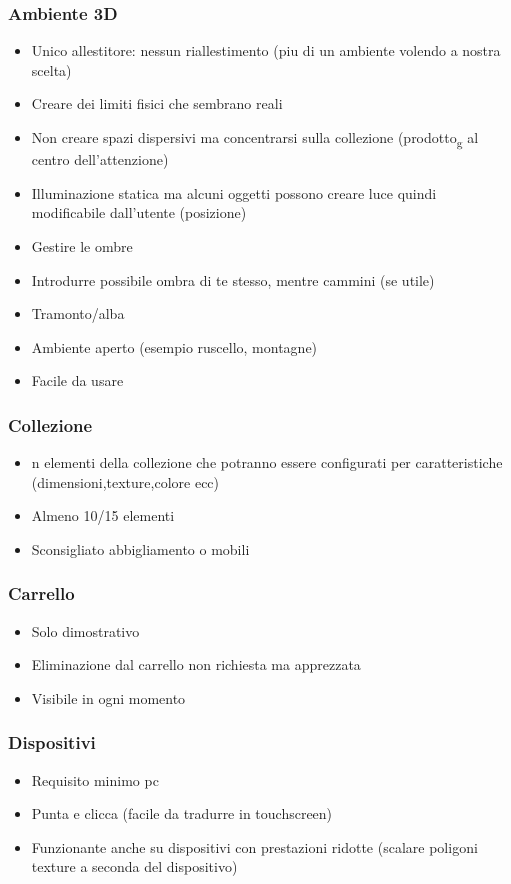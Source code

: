 \subsubsection{Ambiente 3D}
\begin{itemize}
    \item Unico allestitore: nessun riallestimento (piu di un ambiente volendo a nostra scelta)
    \item Creare dei limiti fisici che sembrano reali
    \item Non creare spazi dispersivi ma concentrarsi sulla collezione (prodotto\textsubscript{g} al centro dell'attenzione)
    \item Illuminazione statica ma alcuni oggetti possono creare luce quindi modificabile dall'utente (posizione)
    \item Gestire le ombre
    \item Introdurre possibile ombra di te stesso, mentre cammini (se utile)
    \item Tramonto/alba
    \item Ambiente aperto (esempio ruscello, montagne)
    \item Facile da usare
\end{itemize}
\subsubsection{Collezione}
\begin{itemize}
    \item n elementi della collezione che potranno essere configurati per caratteristiche (dimensioni,texture,colore ecc)
    \item Almeno 10/15 elementi
    \item Sconsigliato abbigliamento o mobili
\end{itemize}
\subsubsection{Carrello}
\begin{itemize}
    \item Solo dimostrativo
    \item Eliminazione dal carrello non richiesta ma apprezzata
    \item Visibile in ogni momento
\end{itemize}
\subsubsection{Dispositivi}
\begin{itemize}
    \item Requisito minimo pc
    \item Punta e clicca (facile da tradurre in touchscreen)
    \item Funzionante anche su dispositivi con prestazioni ridotte (scalare poligoni texture a seconda del dispositivo)
\end{itemize}

